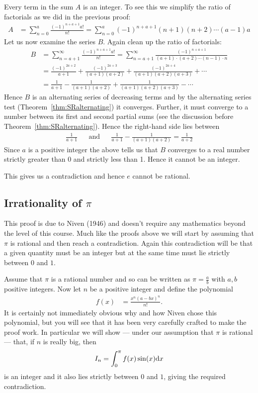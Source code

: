Every term in the sum $A$ is an integer. To see this we simplify
the ratio of factorials as we did in the previous proof:
\begin{align*}
A &=
\sum_{n=0}^a \frac{(-1)^{n+a+1} a!}{n!}
=
\sum_{n=0}^a (-1)^{n+a+1} (n+1)(n+2)\cdots (a-1) a
\end{align*}
Let us now examine the series $B$. Again clean up the ratio of factorials:
\begin{align*}
  B &= \sum_{n=a+1}^\infty \frac{(-1)^{n+a+1} a!}{n!}
  = \sum_{n=a+1}^\infty \frac{(-1)^{n+a+1} }
              {(a+1)\cdot (a+2)\cdots (n-1) \cdot n}
 \\
&= \frac{(-1)^{2a+2}}{a+1}
+ \frac{(-1)^{2a+3}}{(a+1)(a+2)}
+ \frac{(-1)^{2a+4}}{(a+1)(a+2)(a+3)}
+ \cdots
\\
&=
\frac{1}{a+1} - \frac{1}{(a+1)(a+2)} + \frac{1}{(a+1)(a+2)(a+3)} - \cdots
\end{align*}
Hence $B$ is an alternating series of decreasing terms and by the alternating series test
(Theorem~\ref{thm:SRalternating}) it converges. Further, it must converge to a number
between its first and second partial sums (see the discussion before
Theorem~\ref{thm:SRalternating}). Hence the right-hand side lies between
\begin{align*}
\frac{1}{a+1}
&& \text{and} &&
\frac{1}{a+1} - \frac{1}{(a+1)(a+2)} = \frac{1}{a+2}
\end{align*}
Since $a$ is a positive integer the above tells us that $B$ converges to a real number strictly
greater than $0$ and strictly less than 1. Hence it cannot be an integer.

This gives us a contradiction and hence $e$ cannot be rational.

\subsection*{Irrationality of $\pi$}
This proof is due to Niven (1946) and doesn't require any mathematics
beyond the level of this course. Much like the proofs above we will start
by assuming that $\pi$ is rational and then reach a contradiction. Again
this contradiction will be that a given quantity must be an integer but
at the same time must lie strictly between $0$ and $1$.


Assume that $\pi$ is a rational number and so can be written as $\pi = \frac{a}{b}$ with $a,b$ positive integers. Now
let $n$ be a positive integer and define the polynomial
\begin{align*}
  f(x) &= \frac{x^n(a-bx)^n}{n!}.
\end{align*}
It is certainly not immediately obvious why and how Niven chose this polynomial, but you will see that it has been
very carefully crafted to make the proof work. In particular we will show --- under our assumption that $\pi$ is
rational --- that, if $n$ is really big, then
\begin{align*}
  I_n=\int_0^\pi f(x) \sin(x) \mathrm{d}x
\end{align*}
is an integer and it also lies strictly between $0$ and $1$,
giving the required contradiction.


